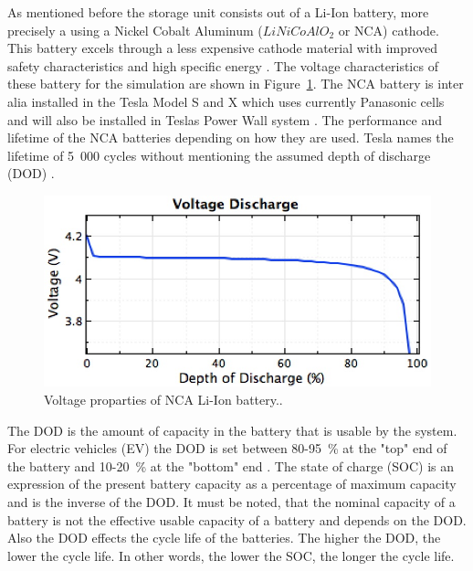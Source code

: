 As mentioned before the storage unit consists out of a Li-Ion battery, more precisely a using a Nickel Cobalt Aluminum ($LiNiCoAlO_2$  or NCA) cathode. This battery excels through a less expensive cathode material with improved safety characteristics and high specific energy \cite{NREL2015a}. The voltage characteristics of these battery for the simulation are shown in Figure~\ref{EES_VoltageDischarge}. The NCA battery is inter alia installed in the Tesla Model S and X \cite{Nykvist2015} which uses currently Panasonic cells and will also be installed in Teslas Power Wall system \cite{Shahan2015}. The performance and lifetime of the NCA batteries depending on how they are used. Tesla names the lifetime of 5~000 cycles without mentioning the assumed depth of discharge (DOD) \cite{Shahan2015}.

\begin{figure}[!htbp]  
\centering
\includegraphics[width=0.6\linewidth]{FIG/EES_VoltageDischarge}
\caption[Voltage proparties of NCA Li-Ion battery.]{Voltage proparties of NCA Li-Ion battery..}\label{EES_VoltageDischarge}
\end{figure}



The DOD is the amount of capacity in the battery that is usable by the system. For electric vehicles (EV) the DOD is set between 80-95~\% at the "top" end of the battery and 10-20~\% at the "bottom" end \cite{Warner2014}. The state of charge (SOC) is an expression of the present battery capacity as a percentage of maximum capacity and is the inverse of the DOD. It must be noted, that the nominal capacity of a battery is not the effective usable capacity of a battery and depends on the DOD. Also the DOD effects the cycle life of the batteries. The higher the DOD, the lower the cycle life. In other words, the lower the SOC, the longer the cycle life. \cite{MitElectricVehilceTeam2008}



